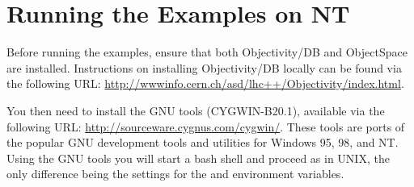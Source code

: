 \section{Running the Examples on NT}

\par

Before running the examples, ensure that both Objectivity/DB and ObjectSpace are installed.
Instructions on installing Objectivity/DB locally can be found via the following URL:
\url{http://wwwinfo.cern.ch/asd/lhc++/Objectivity/index.html}.

\par

You then need to install the GNU tools (CYGWIN-B20.1), available via
the following URL: \url{http://sourceware.cygnus.com/cygwin/}. These tools are ports
of the popular GNU development tools and utilities for Windows 95, 98,
and NT.  Using the GNU tools you will start a bash shell and proceed
as in UNIX, the only difference being the settings for the
 and  environment
variables.

